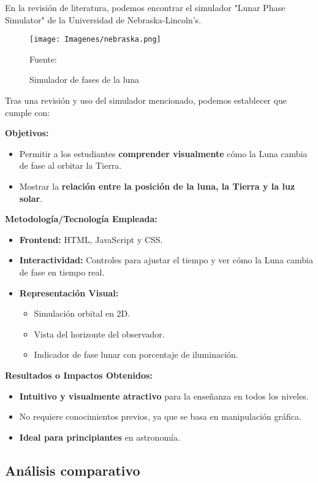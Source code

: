 En la revisión de literatura, podemos encontrar el simulador 
"Lunar Phase Simulator" de la Universidad de Nebraska-Lincoln’s. \cite{Ucar2014}

\begin{figure}[h]
    \texttt{[image: Imagenes/nebraska.png]}
    \centering
    \caption{Simulador de fases de la luna}{Fuente: \cite{UNL2025}}
\end{figure}

Tras una revisión y uso del simulador mencionado, podemos establecer que 
cumple con: 

\textbf{Objetivos:}
\begin{itemize}
    \item Permitir a los estudiantes \textbf{comprender visualmente} cómo la Luna cambia de fase al orbitar la Tierra.
    \item Mostrar la \textbf{relación entre la posición de la luna, la Tierra y la luz solar}.
\end{itemize}

\textbf{Metodología/Tecnología Empleada:}
\begin{itemize}
    \item \textbf{Frontend:} HTML, JavaScript y CSS.
    \item \textbf{Interactividad:} Controles para ajustar el tiempo y ver cómo la Luna cambia de fase en tiempo real.
    \item \textbf{Representación Visual:}
    \begin{itemize}
        \item Simulación orbital en 2D.
        \item Vista del horizonte del observador.
        \item Indicador de fase lunar con porcentaje de iluminación.
    \end{itemize}
\end{itemize}

\textbf{ Resultados o Impactos Obtenidos:}
\begin{itemize}
    \item \textbf{Intuitivo y visualmente atractivo} para la enseñanza en todos los niveles.
    \item No requiere conocimientos previos, ya que se basa en manipulación gráfica.
    \item \textbf{Ideal para principiantes} en astronomía.
\end{itemize}

\subsection*{Análisis comparativo}

